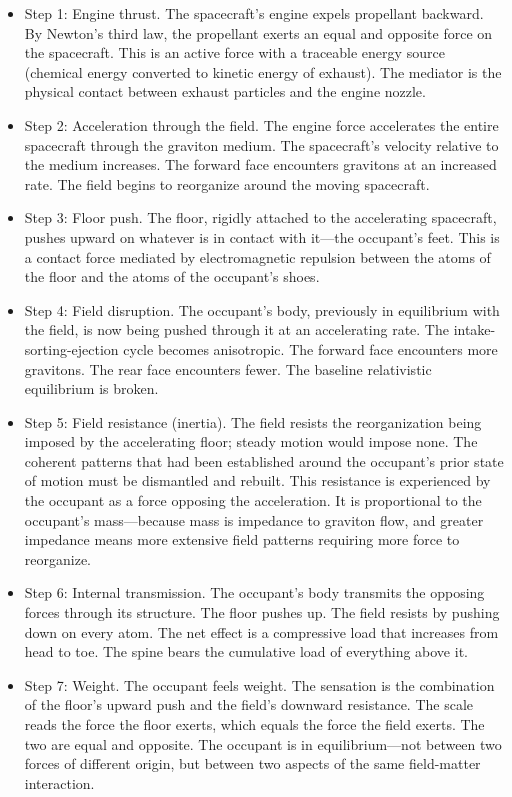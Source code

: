 \documentclass[11pt]{article}
\begin{document}
\begin{itemize}
\item
  Step 1: Engine thrust. The spacecraft's engine expels propellant backward. By Newton's third law, the propellant exerts an equal and opposite force on the spacecraft. This is an active force with a traceable energy source (chemical energy converted to kinetic energy of exhaust). The mediator is the physical contact between exhaust particles and the engine nozzle.
\item
  Step 2: Acceleration through the field. The engine force accelerates the entire spacecraft through the graviton medium. The spacecraft's velocity relative to the medium increases. The forward face encounters gravitons at an increased rate. The field begins to reorganize around the moving spacecraft.
\item
  Step 3: Floor push. The floor, rigidly attached to the accelerating spacecraft, pushes upward on whatever is in contact with it---the occupant's feet. This is a contact force mediated by electromagnetic repulsion between the atoms of the floor and the atoms of the occupant's shoes.
\item
  Step 4: Field disruption. The occupant's body, previously in equilibrium with the field, is now being pushed through it at an accelerating rate. The intake-sorting-ejection cycle becomes anisotropic. The forward face encounters more gravitons. The rear face encounters fewer. The baseline relativistic equilibrium is broken.
\item
  Step 5: Field resistance (inertia). The field resists the reorganization being imposed by the accelerating floor; steady motion would impose none. The coherent patterns that had been established around the occupant's prior state of motion must be dismantled and rebuilt. This resistance is experienced by the occupant as a force opposing the acceleration. It is proportional to the occupant's mass---because mass is impedance to graviton flow, and greater impedance means more extensive field patterns requiring more force to reorganize.
\item
  Step 6: Internal transmission. The occupant's body transmits the opposing forces through its structure. The floor pushes up. The field resists by pushing down on every atom. The net effect is a compressive load that increases from head to toe. The spine bears the cumulative load of everything above it.
\item
  Step 7: Weight. The occupant feels weight. The sensation is the combination of the floor's upward push and the field's downward resistance. The scale reads the force the floor exerts, which equals the force the field exerts. The two are equal and opposite. The occupant is in equilibrium---not between two forces of different origin, but between two aspects of the same field-matter interaction.
\end{itemize}
\end{document}
